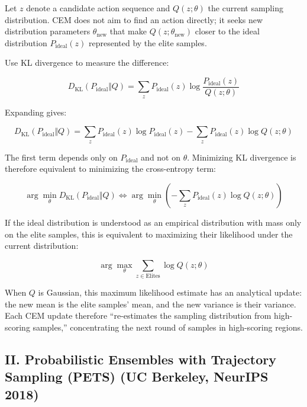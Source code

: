 Let \(z\) denote a candidate action sequence and \(Q(z;\theta)\) the current sampling distribution. CEM does not aim to find an action directly; it seeks new distribution parameters \(\theta_{\mathrm{new}}\) that make \(Q(z;\theta_{\mathrm{new}})\) closer to the ideal distribution \(P_{\mathrm{ideal}}(z)\) represented by the elite samples.

Use KL divergence to measure the difference:

\[
D_{\mathrm{KL}}(P_{\mathrm{ideal}}\Vert Q)
=\sum_z P_{\mathrm{ideal}}(z)\log\frac{P_{\mathrm{ideal}}(z)}{Q(z;\theta)}
\]

Expanding gives:

\[
D_{\mathrm{KL}}(P_{\mathrm{ideal}}\Vert Q)
=\sum_z P_{\mathrm{ideal}}(z)\log P_{\mathrm{ideal}}(z)
-\sum_z P_{\mathrm{ideal}}(z)\log Q(z;\theta)
\]

The first term depends only on \(P_{\mathrm{ideal}}\) and not on \(\theta\). Minimizing KL divergence is therefore equivalent to minimizing the cross-entropy term:

\[
\arg\min_\theta D_{\mathrm{KL}}(P_{\mathrm{ideal}}\Vert Q)
\Longleftrightarrow
\arg\min_\theta\left(-\sum_z P_{\mathrm{ideal}}(z)\log Q(z;\theta)\right)
\]

If the ideal distribution is understood as an empirical distribution with mass only on the elite samples, this is equivalent to maximizing their likelihood under the current distribution:

\[
\arg\max_\theta\sum_{z\in\mathrm{Elites}}\log Q(z;\theta)
\]

When \(Q\) is Gaussian, this maximum likelihood estimate has an analytical update: the new mean is the elite samples' mean, and the new variance is their variance. Each CEM update therefore ``re-estimates the sampling distribution from high-scoring samples,'' concentrating the next round of samples in high-scoring regions.

\hypertarget{ii.-probabilistic-ensembles-with-trajectory-sampling-pets-uc-berkeley-neurips-2018}{%
\subsection{II. Probabilistic Ensembles with Trajectory Sampling (PETS) (UC Berkeley, NeurIPS 2018)}\label{ii.-probabilistic-ensembles-with-trajectory-sampling-pets-uc-berkeley-neurips-2018}}

